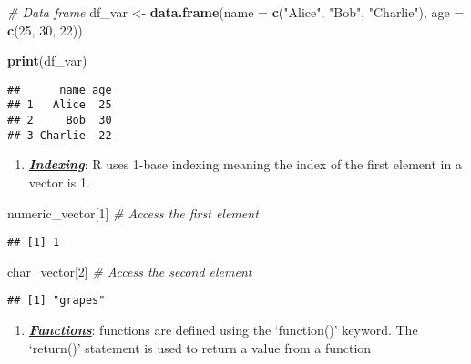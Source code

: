 \documentclass[
]{article}
\newenvironment{Shaded}{\begin{snugshade}}{\end{snugshade}}
\newcommand{\AttributeTok}[1]{\textcolor[rgb]{0.13,0.29,0.53}{#1}}
\newcommand{\CommentTok}[1]{\textcolor[rgb]{0.56,0.35,0.01}{\textit{#1}}}
\newcommand{\DecValTok}[1]{\textcolor[rgb]{0.00,0.00,0.81}{#1}}
\newcommand{\FunctionTok}[1]{\textcolor[rgb]{0.13,0.29,0.53}{\textbf{#1}}}
\newcommand{\NormalTok}[1]{#1}
\newcommand{\OtherTok}[1]{\textcolor[rgb]{0.56,0.35,0.01}{#1}}
\newcommand{\StringTok}[1]{\textcolor[rgb]{0.31,0.60,0.02}{#1}}
\providecommand{\tightlist}{%
  \setlength{\itemsep}{0pt}\setlength{\parskip}{0pt}}
\begin{document}
\begin{enumerate}
\begin{Shaded}
\begin{Highlighting}[]
\CommentTok{\# Data frame}
\NormalTok{df\_var }\OtherTok{\textless{}{-}} \FunctionTok{data.frame}\NormalTok{(}\AttributeTok{name =} \FunctionTok{c}\NormalTok{(}\StringTok{"Alice"}\NormalTok{, }\StringTok{"Bob"}\NormalTok{, }\StringTok{"Charlie"}\NormalTok{), }\AttributeTok{age =} \FunctionTok{c}\NormalTok{(}\DecValTok{25}\NormalTok{, }\DecValTok{30}\NormalTok{, }\DecValTok{22}\NormalTok{))}

\FunctionTok{print}\NormalTok{(df\_var)}
\end{Highlighting}
\end{Shaded}

\begin{verbatim}
##      name age
## 1   Alice  25
## 2     Bob  30
## 3 Charlie  22
\end{verbatim}

  \begin{enumerate}
  \def\labelenumii{\arabic{enumii}.}
  \setcounter{enumii}{5}
  \tightlist
  \item
    \ul{\textbf{\emph{Indexing}}}: R uses 1-base indexing meaning the
    index of the first element in a vector is 1.
  \end{enumerate}
\end{enumerate}

\begin{Shaded}
\begin{Highlighting}[]
\NormalTok{numeric\_vector[}\DecValTok{1}\NormalTok{]  }\CommentTok{\# Access the first element}
\end{Highlighting}
\end{Shaded}

\begin{verbatim}
## [1] 1
\end{verbatim}

\begin{Shaded}
\begin{Highlighting}[]
\NormalTok{char\_vector[}\DecValTok{2}\NormalTok{]    }\CommentTok{\# Access the second element}
\end{Highlighting}
\end{Shaded}

\begin{verbatim}
## [1] "grapes"
\end{verbatim}

\begin{enumerate}
\def\labelenumi{\arabic{enumi}.}
\setcounter{enumi}{6}
\tightlist
\item
  \ul{\textbf{\emph{Functions}}}: functions are defined using the
  `function()' keyword. The `return()' statement is used to return a
  value from a function
\end{enumerate}
\end{document}
